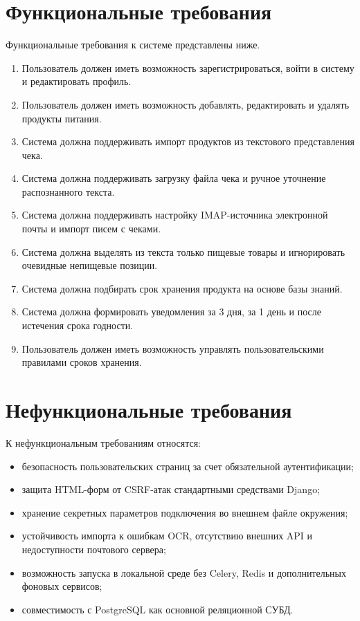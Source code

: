 \documentclass[14pt,a4paper]{extreport}
\begin{document}
\section{Функциональные требования}

Функциональные требования к системе представлены ниже.
\begin{enumerate}
  \item[F1.] Пользователь должен иметь возможность зарегистрироваться, войти в систему и редактировать профиль.
  \item[F2.] Пользователь должен иметь возможность добавлять, редактировать и удалять продукты питания.
  \item[F3.] Система должна поддерживать импорт продуктов из текстового представления чека.
  \item[F4.] Система должна поддерживать загрузку файла чека и ручное уточнение распознанного текста.
  \item[F5.] Система должна поддерживать настройку IMAP-источника электронной почты и импорт писем с чеками.
  \item[F6.] Система должна выделять из текста только пищевые товары и игнорировать очевидные непищевые позиции.
  \item[F7.] Система должна подбирать срок хранения продукта на основе базы знаний.
  \item[F8.] Система должна формировать уведомления за 3 дня, за 1 день и после истечения срока годности.
  \item[F9.] Пользователь должен иметь возможность управлять пользовательскими правилами сроков хранения.
\end{enumerate}

\section{Нефункциональные требования}

К нефункциональным требованиям относятся:
\begin{itemize}
  \item безопасность пользовательских страниц за счет обязательной аутентификации;
  \item защита HTML-форм от CSRF-атак стандартными средствами Django;
  \item хранение секретных параметров подключения во внешнем файле окружения;
  \item устойчивость импорта к ошибкам OCR, отсутствию внешних API и недоступности почтового сервера;
  \item возможность запуска в локальной среде без Celery, Redis и дополнительных фоновых сервисов;
  \item совместимость с PostgreSQL как основной реляционной СУБД.
\end{itemize}
\end{document}
